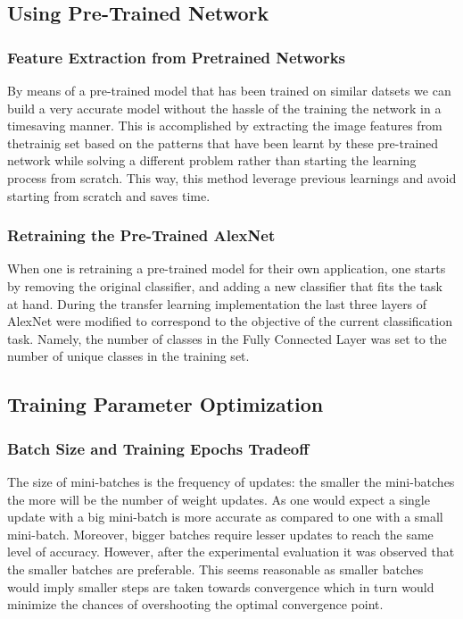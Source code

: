 \documentclass[doc/report.tex]{subfiles}
\begin{document}
\subsection{Using Pre-Trained Network}
\subsubsection{Feature Extraction from Pretrained Networks}
By means of a pre-trained model that has been trained on similar datsets we can build a very accurate model without the hassle of the training the network in a timesaving manner. This is accomplished by extracting the image features from thetrainig set based on the patterns that have been learnt by these pre-trained network while solving a different problem rather than starting the learning process from scratch. This way, this method leverage previous learnings and avoid starting from scratch and saves time.  

\subsubsection{Retraining the Pre-Trained AlexNet}
When one is retraining a pre-trained model for their own application, one starts by removing the original classifier, and adding a new classifier that fits the task at hand. During the transfer learning implementation the last three layers of AlexNet were modified
to correspond to the objective of the current classification task. Namely, the number of classes in the Fully Connected Layer was set to the number of unique classes in the training set.

\subsection{Training Parameter Optimization}
\subsubsection{Batch Size and Training Epochs Tradeoff}
The size of mini-batches is the frequency of updates: the smaller the mini-batches the more will be the number of weight updates. As one would expect a single update with a big mini-batch is more accurate as compared to one with a small mini-batch. Moreover, bigger batches require lesser updates to reach the same level of accuracy. However, after the experimental evaluation it was observed that the smaller batches are preferable. This seems reasonable as smaller batches would imply smaller steps are taken towards convergence which in turn would minimize the chances of overshooting the optimal convergence point.
\end{document}

